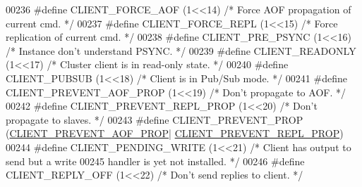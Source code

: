 \begin{DoxyCode}
{{{{{{00236 \textcolor{preprocessor}{#}\textcolor{preprocessor}{define} \textcolor{preprocessor}{CLIENT\_FORCE\_AOF} \textcolor{preprocessor}{(}1\textcolor{preprocessor}{<<}14\textcolor{preprocessor}{)}   \textcolor{comment}{/* Force AOF propagation of current cmd. */}
00237 \textcolor{preprocessor}{#}\textcolor{preprocessor}{define} \textcolor{preprocessor}{CLIENT\_FORCE\_REPL} \textcolor{preprocessor}{(}1\textcolor{preprocessor}{<<}15\textcolor{preprocessor}{)}  \textcolor{comment}{/* Force replication of current cmd. */}
00238 \textcolor{preprocessor}{#}\textcolor{preprocessor}{define} \textcolor{preprocessor}{CLIENT\_PRE\_PSYNC} \textcolor{preprocessor}{(}1\textcolor{preprocessor}{<<}16\textcolor{preprocessor}{)}   \textcolor{comment}{/* Instance don't understand PSYNC. */}
00239 \textcolor{preprocessor}{#}\textcolor{preprocessor}{define} \textcolor{preprocessor}{CLIENT\_READONLY} \textcolor{preprocessor}{(}1\textcolor{preprocessor}{<<}17\textcolor{preprocessor}{)}    \textcolor{comment}{/* Cluster client is in read-only state. */}
00240 \textcolor{preprocessor}{#}\textcolor{preprocessor}{define} \textcolor{preprocessor}{CLIENT\_PUBSUB} \textcolor{preprocessor}{(}1\textcolor{preprocessor}{<<}18\textcolor{preprocessor}{)}      \textcolor{comment}{/* Client is in Pub/Sub mode. */}
00241 \textcolor{preprocessor}{#}\textcolor{preprocessor}{define} \textcolor{preprocessor}{CLIENT\_PREVENT\_AOF\_PROP} \textcolor{preprocessor}{(}1\textcolor{preprocessor}{<<}19\textcolor{preprocessor}{)}  \textcolor{comment}{/* Don't propagate to AOF. */}
00242 \textcolor{preprocessor}{#}\textcolor{preprocessor}{define} \textcolor{preprocessor}{CLIENT\_PREVENT\_REPL\_PROP} \textcolor{preprocessor}{(}1\textcolor{preprocessor}{<<}20\textcolor{preprocessor}{)}  \textcolor{comment}{/* Don't propagate to slaves. */}
00243 \textcolor{preprocessor}{#}\textcolor{preprocessor}{define} \textcolor{preprocessor}{CLIENT\_PREVENT\_PROP} \textcolor{preprocessor}{(}\hyperlink{server_8h_a9948ae3a2778b5a06b704231b921e7fa}{CLIENT\_PREVENT\_AOF\_PROP}\textcolor{preprocessor}{|}
      \hyperlink{server_8h_a01c18c16bc758787b5cfc287eb7b089e}{CLIENT\_PREVENT\_REPL\_PROP}\textcolor{preprocessor}{)}
00244 \textcolor{preprocessor}{#}\textcolor{preprocessor}{define} \textcolor{preprocessor}{CLIENT\_PENDING\_WRITE} \textcolor{preprocessor}{(}1\textcolor{preprocessor}{<<}21\textcolor{preprocessor}{)} \textcolor{comment}{/* Client has output to send but a write}
00245 \textcolor{comment}{                                        handler is yet not installed. */}
00246 \textcolor{preprocessor}{#}\textcolor{preprocessor}{define} \textcolor{preprocessor}{CLIENT\_REPLY\_OFF} \textcolor{preprocessor}{(}1\textcolor{preprocessor}{<<}22\textcolor{preprocessor}{)}   \textcolor{comment}{/* Don't send replies to client. */}
}}}}}}
\end{DoxyCode}

